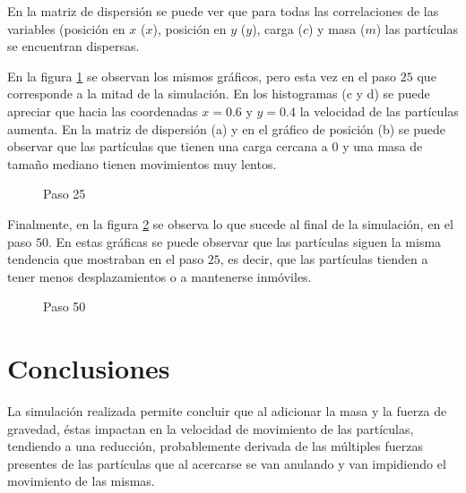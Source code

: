 \documentclass{article}
\begin{document}
En la matriz de dispersi\'on se puede ver que para todas las correlaciones de las variables (posici\'on en $x$ ($x$), posici\'on en $y$ ($y$), carga ($c$) y masa ($m$) las part\'iculas se encuentran dispersas.




En la figura \ref{f2} se observan los mismos gr\'aficos, pero esta vez en el paso $25$ que corresponde a la mitad de la simulaci\'on.   En los histogramas (c y d) se puede apreciar que hacia las coordenadas $x=0.6$ y $y=0.4$ la velocidad de las part\'iculas aumenta.  En la matriz de dispersi\'on (a) y en el gr\'afico de posici\'on (b) se puede observar que las part\'iculas que tienen una carga cercana a $0$ y una masa de tama\~no mediano tienen movimientos muy lentos.

\begin{figure}[htbp]

\caption{Paso 25} \label{f2}
\end{figure}

Finalmente, en la figura \ref{f3} se observa lo que sucede al final de la simulaci\'on, en el paso $50$.  En estas gr\'aficas se puede observar que las part\'iculas siguen la misma tendencia que mostraban en el paso $25$, es decir, que las part\'iculas tienden a tener menos desplazamientos o a mantenerse inm\'oviles.  

\begin{figure}[htbp]

\caption{Paso 50} \label{f3}
\end{figure}

\section{Conclusiones}\label{con}   

La simulaci\'on realizada permite concluir que al adicionar la masa y la fuerza de gravedad, \'estas impactan en la velocidad de movimiento de las part\'iculas, tendiendo a una reducci\'on, probablemente derivada de las m\'ultiples fuerzas presentes de las part\'iculas que al acercarse se van anulando y van impidiendo el movimiento de las mismas.  

\printbibliography
\end{document}
